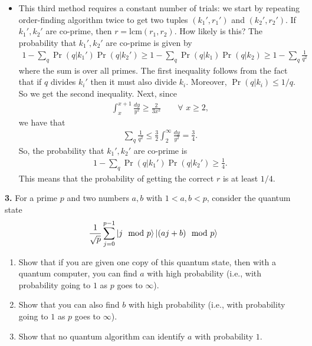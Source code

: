 \documentclass{article}
\theoremstyle{definition}
\newcommand{\f}[2]{\frac{#1}{#2}}
\begin{document}
\begin{enumerate}[label=(\alph*)]
\begin{itemize}
	\item This third method requires a constant number of trials: we start by repeating order-finding algorithm twice to get two tuples $(k_1',r_1')$ and $(k_2',r_2')$. If $k_1', k_2'$ are co-prime, then $r = \text{lcm}(r_1,r_2)$. How likely is this? The probability that $k_1',k_2'$ are co-prime is given by 
	\begin{align*}
		1- \sum_q \Pr(q|k_1') \Pr(q| k_2') \geq 1- \sum_q \Pr(q|k_1) \Pr(q| k_2) \geq 1 - \sum_q \f{1}{q^2} 
	\end{align*}
	where the sum is over all primes.  The first inequality follows from the fact that if $q$ divides $k_i'$ then it must also divide $k_i$. Moreover, $\Pr(q|k_i) \leq 1/q$. So we get the second inequality. Next, since
	\begin{align*}
		\int_{x}^{x+1} \f{dy}{y^2} \geq \f{2}{3x^2} \quad\quad \forall \,\, x \geq 2,
	\end{align*}
	we have that
	\begin{align*}
		\sum_q \f{1}{q^2} \leq \f{3}{2}\int_2^\infty \f{dy}{y^2} = \f{3}{4}.
	\end{align*}
	So, the probability that $k_1', k_2'$ are co-prime is 
	\begin{align*}
			1- \sum_q \Pr(q|k_1') \Pr(q| k_2') \geq \f{1}{4}. 
	\end{align*}
	This means that the probability of getting the correct $r$ is at least $1/4$. 
\end{itemize}

\end{enumerate}



\newpage


\noindent \textbf{3. } For a prime $p$ and two numbers $a,b$ with $1 < a, b < p$, consider the quantum state
\begin{align*}
\f{1}{\sqrt{p}} \sum^{p-1}_{j=0} \ket{ j \mod p } \ket{(aj + b) \mod p}
\end{align*}

\begin{enumerate}[label=(\alph*)]

\item Show that if you are given one copy of this quantum state, then with a quantum computer, you can find $a$ with high probability (i.e., with probability going to $1$ as $p$ goes to $\infty$). 

\item Show that you can also find $b$ with high probability (i.e., with probability going to $1$ as $p$ goes to $\infty$).

\item Show that no quantum algorithm can identify $a$ with probability $1$.



\end{enumerate}
\end{document}
